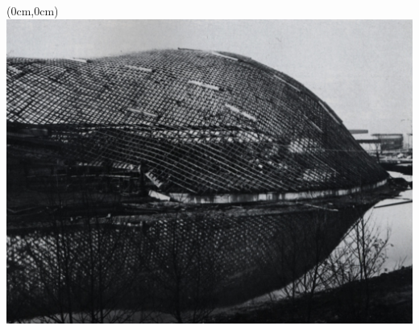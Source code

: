 \documentclass[fleqn]{thesis}
\begin{document}
	\begin{textblock*}{10cm}(0cm,0cm)%
		\setlength{\parskip}{0pt}
		\includegraphics[width=.25\paperwidth]{mannheim_erection_2.jpg}
	\end{textblock*}
\end{document}
